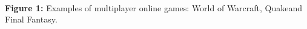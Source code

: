 \documentclass[a0,portrait,svgnames]{a0poster}
\begin{document}
\begin{textblock}{7}
\begin{center}
\\{\bfseries Figure 1:} Examples of multiplayer online games: World of Warcraft\footnotemark, Quake\footnotemark and Final Fantasy\footnotemark.
\end{center}
  
  


\end{textblock}

\end{document}
